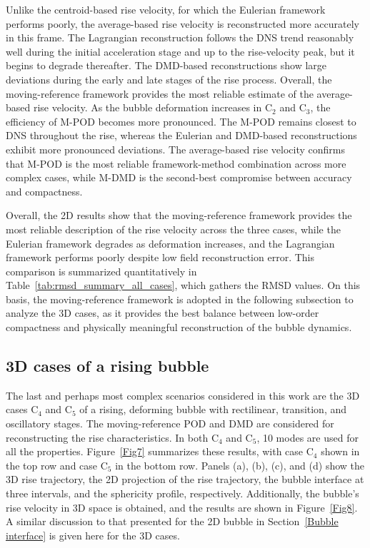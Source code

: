 \documentclass[a4paper,fleqn]{cas-sc}
\begin{document}
	Unlike the centroid-based rise velocity, for which the Eulerian framework performs poorly, the average-based rise velocity is reconstructed more accurately in this frame. The Lagrangian reconstruction follows the DNS trend reasonably well during the initial acceleration stage and up to the rise-velocity peak, but it begins to degrade thereafter. The DMD-based reconstructions show large deviations during the early and late stages of the rise process. Overall, the moving-reference framework provides the most reliable estimate of the average-based rise velocity. As the bubble deformation increases in C$_2$ and C$_3$, the efficiency of M-POD becomes more pronounced. The M-POD remains closest to DNS throughout the rise, whereas the Eulerian and DMD-based reconstructions exhibit more pronounced deviations. The average-based rise velocity confirms that M-POD is the most reliable framework-method combination across more complex cases, while M-DMD is the second-best compromise between accuracy and compactness.
	
	Overall, the 2D results show that the moving-reference framework provides the most reliable description of the rise velocity across the three cases, while the Eulerian framework degrades as deformation increases, and the Lagrangian framework performs poorly despite low field reconstruction error. This comparison is summarized quantitatively in Table~\ref{tab:rmsd_summary_all_cases}, which gathers the RMSD values. On this basis, the moving-reference framework is adopted in the following subsection to analyze the 3D cases, as it provides the best balance between low-order compactness and physically meaningful reconstruction of the bubble dynamics.
	
	\subsection{3D cases of a rising bubble}
	
	The last and perhaps most complex scenarios considered in this work are the 3D cases C$_4$ and C$_5$ of a rising, deforming bubble with rectilinear, transition, and oscillatory stages. The moving-reference POD and DMD are considered for reconstructing the rise characteristics. In both C$_4$ and C$_5$, 10 modes are used for all the properties. Figure~\ref{Fig7} summarizes these results, with case C$_4$ shown in the top row and case C$_5$ in the bottom row. Panels (a), (b), (c), and (d) show the 3D rise trajectory, the 2D projection of the rise trajectory, the bubble interface at three intervals, and the sphericity profile, respectively. Additionally, the bubble's rise velocity in 3D space is obtained, and the results are shown in Figure~\ref{Fig8}. A similar discussion to that presented for the 2D bubble in Section~\ref{Bubble interface} is given here for the 3D cases. 
	
\end{document}
